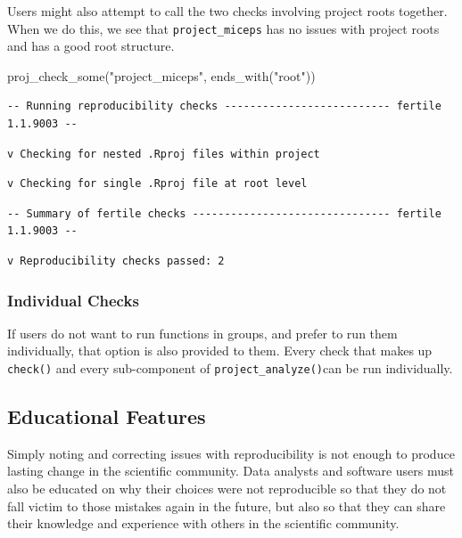 \documentclass[12pt,twoside]{reedthesis}
\newenvironment{Shaded}{\begin{snugshade}}{\end{snugshade}}
\newcommand{\FunctionTok}[1]{\textcolor[rgb]{0.00,0.00,0.00}{#1}}
\newcommand{\NormalTok}[1]{#1}
\newcommand{\StringTok}[1]{\textcolor[rgb]{0.31,0.60,0.02}{#1}}
\begin{document}
Users might also attempt to call the two checks involving project roots together. When we do this, we see that \texttt{project\_miceps} has no issues with project roots and has a good root structure.
\begin{Shaded}
\begin{Highlighting}[]
\FunctionTok{proj\_check\_some}\NormalTok{(}\StringTok{"project\_miceps"}\NormalTok{, }\FunctionTok{ends\_with}\NormalTok{(}\StringTok{"root"}\NormalTok{))}
\end{Highlighting}
\end{Shaded}
\footnotesize
\begin{verbatim}
-- Running reproducibility checks -------------------------- fertile 1.1.9003 --
\end{verbatim}
\begin{verbatim}
v Checking for nested .Rproj files within project
\end{verbatim}
\begin{verbatim}
v Checking for single .Rproj file at root level
\end{verbatim}
\begin{verbatim}
-- Summary of fertile checks ------------------------------- fertile 1.1.9003 --
\end{verbatim}
\begin{verbatim}
v Reproducibility checks passed: 2
\end{verbatim}
\normalsize

\hypertarget{individual-checks}{%
\subsubsection{Individual Checks}\label{individual-checks}}

If users do not want to run functions in groups, and prefer to run them individually, that option is also provided to them. Every check that makes up \texttt{check()} and every sub-component of \texttt{project\_analyze()}can be run individually.

\hypertarget{educational-features}{%
\subsection{Educational Features}\label{educational-features}}

Simply noting and correcting issues with reproducibility is not enough to produce lasting change in the scientific community. Data analysts and software users must also be educated on why their choices were not reproducible so that they do not fall victim to those mistakes again in the future, but also so that they can share their knowledge and experience with others in the scientific community.
\end{document}
